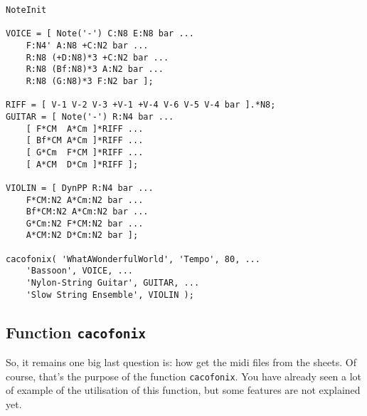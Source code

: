 \documentclass{article}
\begin{document}

\begin{lstlisting}
NoteInit

VOICE = [ Note('-') C:N8 E:N8 bar ...
	F:N4' A:N8 +C:N2 bar ...
	R:N8 (+D:N8)*3 +C:N2 bar ...
	R:N8 (Bf:N8)*3 A:N2 bar ...
	R:N8 (G:N8)*3 F:N2 bar ];

RIFF = [ V-1 V-2 V-3 +V-1 +V-4 V-6 V-5 V-4 bar ].*N8;
GUITAR = [ Note('-') R:N4 bar ...
	[ F*CM  A*Cm ]*RIFF ...
	[ Bf*CM A*Cm ]*RIFF ...
	[ G*Cm  F*CM ]*RIFF ...
	[ A*CM  D*Cm ]*RIFF ];

VIOLIN = [ DynPP R:N4 bar ...
	F*CM:N2 A*Cm:N2 bar ...
	Bf*CM:N2 A*Cm:N2 bar ...
	G*Cm:N2 F*CM:N2 bar ...
	A*CM:N2 D*Cm:N2 bar ];

cacofonix( 'WhatAWonderfulWorld', 'Tempo', 80, ...
	'Bassoon', VOICE, ...
	'Nylon-String Guitar', GUITAR, ...
	'Slow String Ensemble', VIOLIN );
\end{lstlisting}

\subsection{Function \lstinline!cacofonix!}
\label{sec:CacofonixFunction}

So, it remains one big last question is: how get the midi files from the sheets. Of course, that's the purpose of the function \lstinline!cacofonix!. You have already seen a lot of example of the utilisation of this function, but some features are not explained yet.
\end{document}
